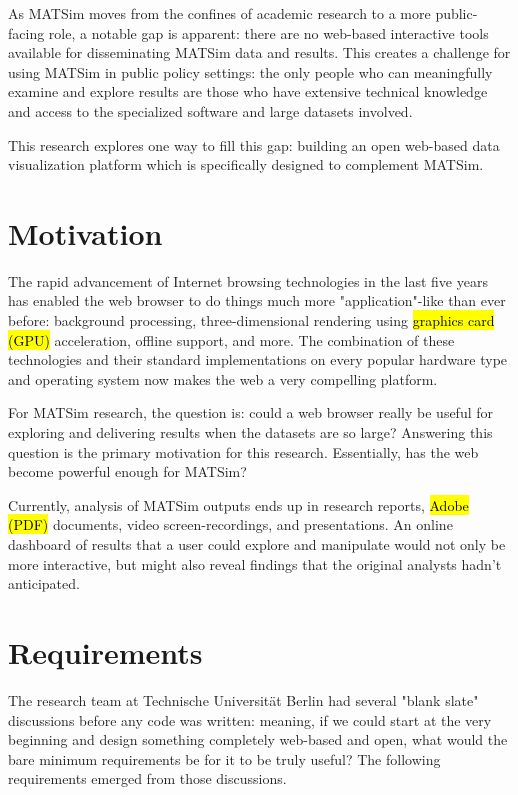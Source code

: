 \documentclass[Afour,sagev,times]{sagej}
\begin{document}
As MATSim moves from the confines of academic research to a more
public-facing role, a notable gap is apparent: there are no web-based interactive tools available for disseminating MATSim data and results. This creates a challenge for using MATSim in public policy settings: the only people who can meaningfully examine and explore results are those who have extensive technical knowledge and access to the specialized software and large datasets involved.

This research explores one way to fill this gap: building an open
web-based data visualization platform which is specifically designed
to complement MATSim.

\section{Motivation}

The rapid advancement of Internet browsing technologies in the last
five years has enabled the web browser to do things much more
"application"-like than ever before: background processing,
three-dimensional rendering using \hl{graphics card (GPU)} acceleration, offline
support, and more. The combination of these technologies and their
standard implementations on every popular hardware type and operating system now makes the web a very compelling platform.

For MATSim research, the question is: could a web browser really
be useful for exploring and delivering results when the datasets
are so large? Answering this question is the primary motivation for
this research. Essentially, has the web become powerful enough for MATSim?

Currently, analysis of MATSim outputs ends up in research reports, \hl{Adobe (PDF)} documents, video screen-recordings, and presentations. An online dashboard of results that a user could explore and manipulate would not only be more interactive, but might also reveal findings that the original analysts hadn't anticipated.

\section{Requirements}
The research team at Technische Universit\"at Berlin had several
"blank slate" discussions before any code was written: meaning,
if we could start at the very beginning and design something completely web-based and open, what would the bare minimum requirements be for it to be truly useful? The following requirements emerged from those discussions.
\end{document}
